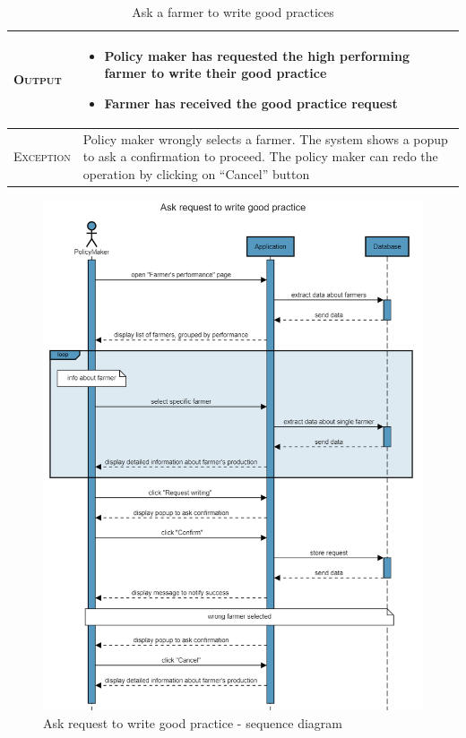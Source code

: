 \begin{table}[H]
\begin{tabular}{|l|p{}|}
    	\hline %
    	\textsc{Output}             &  \begin{itemize}
    	    \item Policy maker has requested the high performing farmer to write their good practice
    	    \item Farmer has received the good practice request
    	\end{itemize}\\
    	\hline %
    	\textsc{Exception}         &  Policy maker wrongly selects a farmer. The 
    	system shows a popup to ask a confirmation to proceed. The policy maker can redo the operation by clicking on “Cancel” button\\
    	\hline %
        
    \end{tabular}
    \caption{\label{tab:ask_good_practices}Ask a farmer to write good practices} 
\end{table}

\begin{figure}[H]
    \centering
    \includegraphics[scale=0.5]{Images/Sequence diagrams/SE2 - Ask request to write good practice (pm).png}
    \caption{Ask request to write good practice - sequence diagram}
    \label{fig:my_label}
\end{figure}


